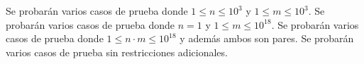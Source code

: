 \documentclass{oci}
\begin{document}
\clearpage
\begin{scoreDescription}
   Se probarán varios casos de prueba donde $1\leq n \leq 10^3$ y $1\leq m\leq 10^3$.
   Se probarán varios casos de prueba donde $n = 1$ y $1 \leq m \leq 10^{18}$.
   Se probarán varios casos de prueba donde $1 \leq n \cdot m \leq 10^{18}$
  y además ambos son pares.
   Se probarán varios casos de prueba sin restricciones adicionales.
\end{scoreDescription}

\begin{sampleDescription}
\end{sampleDescription}
\end{document}
